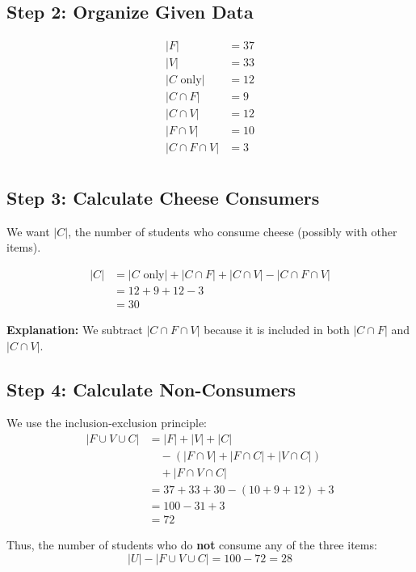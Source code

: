 \documentclass[14pt,a4paper]{article}
\begin{document}
\subsection*{Step 2: Organize Given Data}
\begin{align*}
|F| &= 37 \\
|V| &= 33 \\
|C \text{ only}| &= 12 \\
|C \cap F| &= 9 \\
|C \cap V| &= 12 \\
|F \cap V| &= 10 \\
|C \cap F \cap V| &= 3 \\
\end{align*}

\vspace{1em}

\subsection*{Step 3: Calculate Cheese Consumers}
We want $|C|$, the number of students who consume cheese (possibly with other items).

\begin{align*}
|C| &= |C \text{ only}| + |C \cap F| + |C \cap V| - |C \cap F \cap V| \\
    &= 12 + 9 + 12 - 3 \\
    &= 30
\end{align*}

\textbf{Explanation:} We subtract $|C \cap F \cap V|$ because it is included in both $|C \cap F|$ and $|C \cap V|$.


\subsection*{Step 4: Calculate Non-Consumers}
We use the inclusion-exclusion principle:
\begin{align*}
|F \cup V \cup C| &= |F| + |V| + |C| \\
&\quad - (|F \cap V| + |F \cap C| + |V \cap C|) \\
&\quad + |F \cap V \cap C| \\
&= 37 + 33 + 30 - (10 + 9 + 12) + 3 \\
&= 100 - 31 + 3 \\
&= 72
\end{align*}

Thus, the number of students who do \textbf{not} consume any of the three items:
\[
|U| - |F \cup V \cup C| = 100 - 72 = 28
\]
\end{document}
